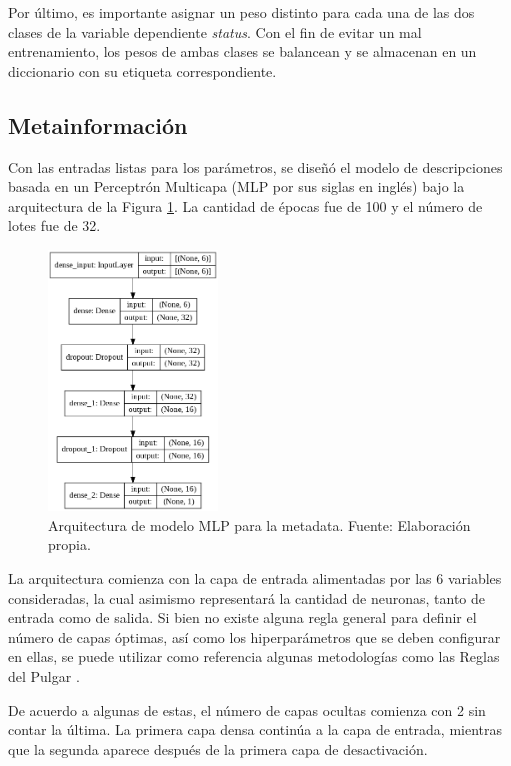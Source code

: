 Por último, es importante asignar un peso distinto para cada una de las dos clases de la variable dependiente \textit{status}. Con el fin de evitar un mal entrenamiento, los pesos de ambas clases se balancean y se almacenan en un diccionario con su etiqueta correspondiente.

\subsection{Metainformación}
Con las entradas listas para los parámetros, se diseñó el modelo de descripciones basada en un Perceptrón Multicapa (MLP por sus siglas en inglés) bajo la arquitectura de la Figura \ref{4:fig35}. La cantidad de épocas fue de 100 y el número de lotes fue de 32.

\begin{figure}[!ht]
	\begin{center}
		\includegraphics[width=0.40\textwidth]{4/figures/model_mlp_metadata.png}
		\caption{Arquitectura de modelo MLP para la metadata. Fuente: Elaboración propia.}
		\label{4:fig35}
	\end{center}
\end{figure}

La arquitectura comienza con la capa de entrada alimentadas por las 6 variables consideradas, la cual asimismo representará la cantidad de neuronas, tanto de entrada como de salida.
Si bien no existe alguna regla general para definir el número de capas óptimas, así como los hiperparámetros que se deben configurar en ellas, se puede utilizar como referencia algunas metodologías como las Reglas del Pulgar \parencite{tec_ranjan2019thumbrules}.

De acuerdo a algunas de estas, el número de capas ocultas comienza con 2 sin contar la última. La primera capa densa continúa a la capa de entrada, mientras que la segunda aparece después de la primera capa de desactivación.

